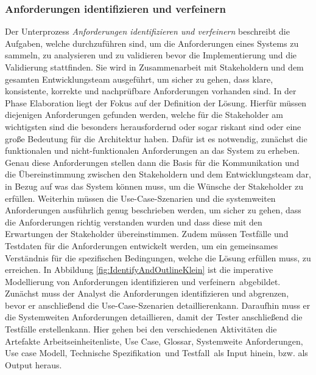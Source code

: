 \subsubsection{Anforderungen identifizieren und verfeinern}
 Der Unterprozess \textit{Anforderungen identifizieren und verfeinern} beschreibt die Aufgaben, welche durchzuführen sind, um die Anforderungen eines Systems zu sammeln, zu analysieren und zu validieren bevor die Implementierung und die Validierung stattfinden. Sie wird in Zusammenarbeit mit Stakeholdern und dem gesamten Entwicklungsteam ausgeführt, um sicher zu gehen, dass klare, konsistente, korrekte und nachprüfbare Anforderungen vorhanden sind.\newline
 In der Phase Elaboration liegt der Fokus auf der Definition der Lösung. Hierfür müssen diejenigen Anforderungen gefunden werden, welche für die Stakeholder am wichtigsten sind die besonders herausfordernd oder sogar riskant sind oder eine große Bedeutung für die Architektur haben.\newline
 Dafür ist es notwendig, zunächst die funktionalen und nicht-funktionalen Anforderungen an das System zu erheben. Genau diese Anforderungen stellen dann die Basis für die Kommunikation und die Übereinstimmung zwischen den Stakeholdern und dem Entwicklungsteam dar, in Bezug auf was das System können muss, um die Wünsche der Stakeholder zu erfüllen.\newline
 Weiterhin müssen die Use-Case-Szenarien und die systemweiten Anforderungen ausführlich genug beschrieben werden, um sicher zu gehen, dass die Anforderungen richtig verstanden wurden und dass diese mit den Erwartungen der Stakeholder übereinstimmen.\newline
 Zudem müssen Testfälle und Testdaten für die Anforderungen entwickelt werden, um ein gemeinsames Verständnis für die spezifischen Bedingungen, welche die Lösung erfüllen muss, zu erreichen.
 In Abbildung \ref{fig:IdentifyAndOutlineKlein} ist die imperative Modellierung von \grqq Anforderungen identifizieren und verfeinern\grqq \ abgebildet. \newline
 Zunächst muss der Analyst die \grqq Anforderungen identifizieren und abgrenzen\grqq, bevor er anschließend die \grqq Use-Case-Szenarien detaillieren\grqq kann. Daraufhin muss er die \grqq Systemweiten Anforderungen detaillieren\grqq, damit der Tester anschließend die \grqq Testfälle erstellen\grqq kann.\newline
 Hier gehen bei den verschiedenen Aktivitäten die Artefakte \grqq Arbeitseinheitenliste\grqq, \grqq Use Case\grqq, \grqq Glossar\grqq, \grqq Systemweite Anforderungen\grqq, \grqq Use case Modell\grqq, \grqq Technische Spezifikation\grqq \ und \grqq Testfall\grqq \ als Input hinein, bzw. als Output heraus.
 
